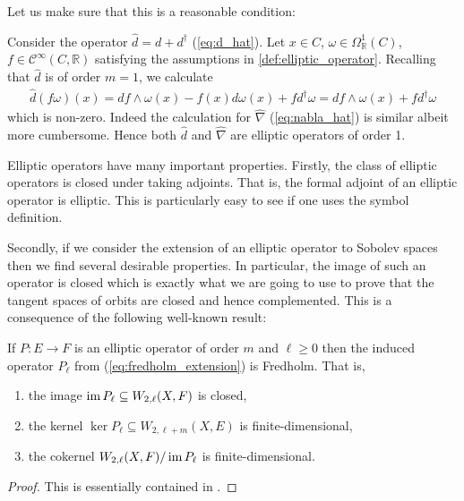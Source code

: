 \documentclass[12pt]{ociamthesis}  %
\begin{document}
Let us make sure that this is a reasonable condition:

\begin{example}
  Consider the operator $\hat d = d + d^\dagger$ (\ref{eq:d_hat}). Let
  $x\in C$, $\omega\in\Omega^1_{\mathbb R}(C)$,
  $f\in \mathscr C^\infty(C,\mathbb R)$
  satisfying the assumptions in \ref{def:elliptic_operator}.
  Recalling that $\hat d$ is of order $m=1$, we calculate
  \begin{align*}
    \hat d(f\omega)(x)= df\wedge \omega(x) - f(x)d\omega(x) + fd^\dagger\omega= df\wedge\omega(x) + fd^\dagger\omega
  \end{align*}
  which is non-zero. Indeed the calculation for
  $\hat\nabla$ (\ref{eq:nabla_hat}) is similar albeit more cumbersome.
  Hence both $\hat d$ and $\hat\nabla$ are elliptic operators of order 1.
\end{example}

Elliptic operators have many important properties. Firstly, the class
of elliptic operators is closed under taking adjoints. That is,
the formal adjoint of an elliptic operator is elliptic. This is particularly
easy to see if one uses the symbol definition.

Secondly, if we consider the extension of an elliptic operator
to Sobolev spaces then we find several desirable properties.
In particular, the image of such an operator is closed which is
exactly what we are going to use to prove that the tangent spaces
of orbits are closed and hence complemented. This is a consequence
of the following well-known result:

\begin{theorem}\label{thm:fredholm_extension}
  If $P : E\to F$ is an elliptic operator of order $m$ and $\ell\geq 0$
  then the induced operator $P_\ell$ from (\ref{eq:fredholm_extension})
  is Fredholm. That is,
  \begin{enumerate}
    \item the image $\operatorname{im} P_\ell \subseteq W_{2,\ell}(X,F)$ is closed,
    \item the kernel $\ker P_\ell \subseteq W_{2,\ell+m}(X,E)$ is finite-dimensional,
    \item the cokernel $W_{2,\ell}(X,F)/\operatorname{im} P_\ell$ is finite-dimensional.
  \end{enumerate}
  \begin{proof}
    This is essentially contained in \cite[Proposition 2.3(3)]{reutter2015}.
  \end{proof}
\end{theorem}
\end{document}
